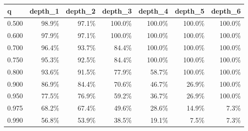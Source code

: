 \begin{tabular}{lrrrrrr}
\toprule
q & depth\_1 & depth\_2 & depth\_3 & depth\_4 & depth\_5 & depth\_6
 \\
\midrule
0.500 & 98.9\% & 97.1\% & 100.0\% & 100.0\% & 100.0\% & 100.0\%
 \\
0.600 & 97.9\% & 97.1\% & 100.0\% & 100.0\% & 100.0\% & 100.0\%
 \\
0.700 & 96.4\% & 93.7\% & 84.4\% & 100.0\% & 100.0\% & 100.0\%
 \\
0.750 & 95.3\% & 92.5\% & 84.4\% & 100.0\% & 100.0\% & 100.0\%
 \\
0.800 & 93.6\% & 91.5\% & 77.9\% & 58.7\% & 100.0\% & 100.0\%
 \\
0.900 & 86.9\% & 84.4\% & 70.6\% & 46.7\% & 26.9\% & 100.0\%
 \\
0.950 & 77.5\% & 76.9\% & 59.2\% & 36.7\% & 26.9\% & 100.0\%
 \\
0.975 & 68.2\% & 67.4\% & 49.6\% & 28.6\% & 14.9\% & 7.3\%
 \\
0.990 & 56.8\% & 53.9\% & 38.5\% & 19.1\% & 7.5\% & 7.3\%
 \\
\bottomrule
\end{tabular}

